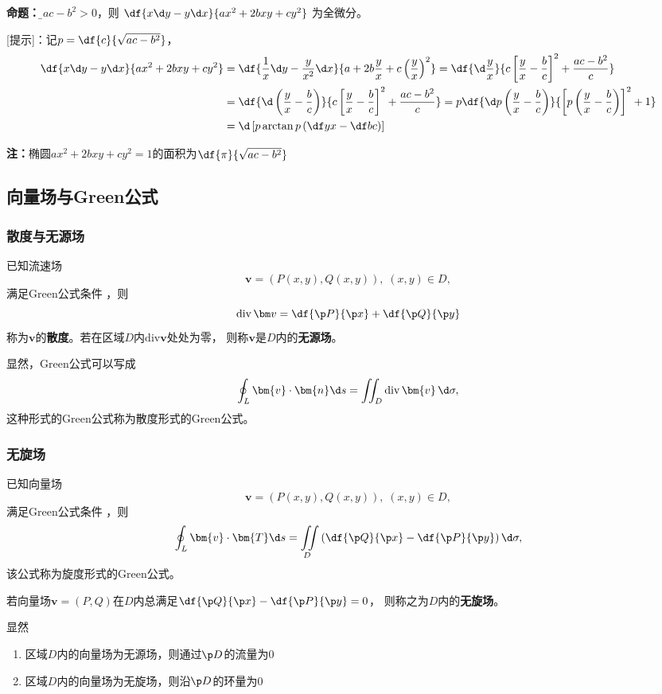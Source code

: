 \begin{shaded}
	{\bf 命题：}{\b 若$ac-b^2>0$，则
	$\df{x\d y-y\d x}{ax^2+2bxy+cy^2}$
	为全微分。}
	
	[提示]：记$p=\df{c}{\sqrt{ac-b^2}}$，
	\begin{align*}
		\df{x\d y-y\d x}{ax^2+2bxy+cy^2}
		&=\df{\frac1x\d y-\frac y{x^2}\d x}{a+2b\frac yx+c\left(\frac yx\right)^2}
		=\df{\d\frac yx}{c\left[\frac yx-\frac bc\right]^2+\frac{ac-b^2}{c}}\\
		&=\df{\d\left(\frac yx-\frac bc\right)}{c\left[\frac yx-\frac
		bc\right]^2+\frac{ac-b^2}{c}}
		=p\df{\d p\left(\frac yx-\frac bc\right)}{\left[p\left(\frac yx-\frac
		bc\right)\right]^2+1}\\
		&=\d\left[p\arctan p\left(\df yx-\df bc\right)\right]
	\end{align*}
	
	{\bf 注：}椭圆$ax^2+2bxy+cy^2=1$的面积为$\df{\pi}{\sqrt{ac-b^2}}$
\end{shaded}

\subsection{向量场与Green公式}

\subsubsection{散度与无源场}

\begin{thx}
	已知流速场
	$$\bm{v}=(P(x,y),Q(x,y)),\;(x,y)\in D,$$
	满足Green公式条件 ，则
	$${\mathrm{div}\,\bm v=\df{\p P}{\p x}+\df{\p Q}{\p y}}$$
	称为$\bm{v}$的{\bf 散度}。若在区域$D$内$\mathrm{div}\bm{v}$处处为零，
	则称$\bm{v}$是$D$内的{\bf 无源场}。 
\end{thx}
显然，Green公式可以写成
$$\oint_L\bm{v}\cdot\bm{n}\d s=\iint_D\mathrm{div}\,\bm{v}\,\d\sigma,$$
这种形式的Green公式称为{\kaishu 散度形式的Green公式}。

\subsubsection{无旋场}

已知向量场
$$\bm{v}=(P(x,y),Q(x,y)),\;(x,y)\in D,$$
满足Green公式条件 ，则
$$\oint_L\bm{v}\cdot\bm{T}\d s=\iint\limits_D\left(
\df{\p Q}{\p x}-\df{\p P}{\p y}\right)\d\sigma,$$
该公式称为{\kaishu 旋度形式的Green公式}。
\begin{thx}
	若向量场$\bm{v}=(P,Q)$在$D$内总满足${\df{\p Q}{\p x}-\df{\p P}{\p y}=0}$，
	则称之为$D$内的{\bf 无旋场}。
\end{thx}
显然
\begin{thx}
	\begin{enumerate}%
	  \item 区域$D$内的向量场为无源场，则通过$\p D$的流量为$0$
	  \item 区域$D$内的向量场为无旋场，则沿$\p D$的环量为$0$
	\end{enumerate}
\end{thx}

